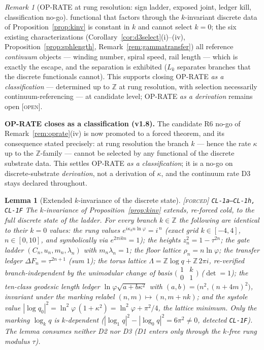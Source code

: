 \documentclass[11pt]{article}
\newcommand{\tagF}{\textcolor{cF}{\textsc{[forced]}}}
\newcommand{\tagO}{\textcolor{cO}{\textsc{[open]}}}
\newcommand{\hx}[1]{\textcolor{cC}{\footnotesize\texttt{#1}}}
\newcommand{\Z}{\mathbb{Z}}
\newcommand{\gp}{\varphi}
\theoremstyle{plain}
\newtheorem{lemma}[theorem]{Lemma}
\theoremstyle{definition}
\theoremstyle{remark}
\newtheorem{remark}[theorem]{Remark}
\begin{document}
\begin{remark}[OP-RATE at rung resolution: sign ladder, exposed joint, ledger kill, classification no-go]
functional that factors through the $k$-invariant discrete data of
Proposition~\ref{prop:kinv} is constant in $k$ and cannot select $k=0$;
the six existing characterizations (Corollary~\ref{cor:d3select}(i)--(iv),
Proposition~\ref{prop:sphlength}, Remark~\ref{rem:gammatransfer}) all
reference \emph{continuum} objects --- winding number, spiral speed, rail
length --- which is exactly the escape, and the separation is exhibited
($L_k$ separates branches that the discrete functionals cannot). This
supports closing OP-RATE \emph{as a classification} --- determined up to
$\Z$ at rung resolution, with selection necessarily continuum-referencing
--- at candidate level; OP-RATE \emph{as a derivation} remains open
\tagO{}.
\end{remark}

\smallskip\noindent
\textbf{OP-RATE closes as a classification (v1.8).} The candidate R6 no-go of
Remark~\ref{rem:oprate}(iv) is now promoted to a forced theorem, and its
consequence stated precisely: at rung resolution the branch $k$ --- hence the
rate $\kappa$ up to the $\Z$-family --- cannot be selected by any functional of
the discrete substrate data. This settles OP-RATE \emph{as a classification};
it is a no-go on discrete-substrate \emph{derivation}, not a derivation of
$\kappa$, and the continuum rate D3 stays declared throughout.

\begin{lemma}[Extended $k$-invariance of the discrete state]\label{lem:kinvext}\tagF{} \hx{CL-1a--CL-1h, CL-1F}
The $k$-invariance of Proposition~\ref{prop:kinv} extends, re-forced cold, to
the \emph{full} discrete state of the ladder. For every branch $k\in\Z$ the
following are identical to their $k=0$ values: the rung values
$e^{i\kappa_kn\ln\gp}=i^{\,n}$ (exact grid $k\in[-4,4]$, $n\in[0,10]$, and
symbolically via $e^{2\pi ikn}=1$); the heights $z_n^2=1-\tau^{2n}$; the gate
ladder $(C_n,u_n,m_n,\lambda_n)$ with $m_n\lambda_n=1$; the floor lattice
$\rho_n=n\ln\gp$; the transfer ledger $\Delta F_n=\tau^{2n+1}$ (sum $1$); the
torus lattice $\Lambda=\Z\log q+\Z\,2\pi i$, re-verified branch-independent by
the unimodular change of basis $\bigl(\begin{smallmatrix}1&k\\0&1\end{smallmatrix}\bigr)$
($\det=1$); the ten-class geodesic length ledger
$\ln\gp\sqrt{a+b\kappa^2}$ with $(a,b)=\bigl(n^2,(n+4m)^2\bigr)$, invariant
under the marking relabel $(n,m)\mapsto(n,m+nk)$; and the \emph{systole value}
$|\log q_0|^2=\ln^2\gp\,(1+\kappa^2)=\ln^2\gp+\pi^2/4$, the lattice minimum.
Only the \emph{marking} $\log_kq$ is $k$-dependent
($|\log_1q|^2-|\log_0q|^2=6\pi^2\ne0$, detected \hx{CL-1F}). The lemma consumes
neither D2 nor D3 (D1 enters only through the $k$-free rung modulus $\tau$).
\end{lemma}
\end{document}
